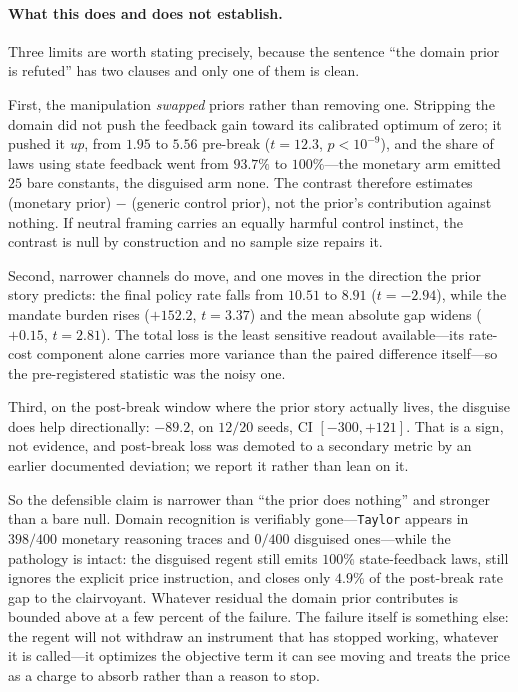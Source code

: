 \documentclass[11pt]{article}
\begin{document}
\paragraph{What this does and does not establish.} Three limits are worth stating precisely, because
the sentence ``the domain prior is refuted'' has two clauses and only one of them is clean.

First, the manipulation \emph{swapped} priors rather than removing one. Stripping the domain did not
push the feedback gain toward its calibrated optimum of zero; it pushed it \emph{up}, from $1.95$ to
$5.56$ pre-break ($t=12.3$, $p<10^{-9}$), and the share of laws using state feedback went from
$93.7\%$ to $100\%$---the monetary arm emitted $25$ bare constants, the disguised arm none. The
contrast therefore estimates (monetary prior) $-$ (generic control prior), not the prior's
contribution against nothing. If neutral framing carries an equally harmful control instinct, the
contrast is null by construction and no sample size repairs it.

Second, narrower channels do move, and one moves in the direction the prior story predicts: the final
policy rate falls from $10.51$ to $8.91$ ($t=-2.94$), while the mandate burden rises ($+152.2$,
$t=3.37$) and the mean absolute gap widens ($+0.15$, $t=2.81$). The total loss is the least sensitive
readout available---its rate-cost component alone carries more variance than the paired difference
itself---so the pre-registered statistic was the noisy one.

Third, on the post-break window where the prior story actually lives, the disguise does help
directionally: $-89.2$, on $12/20$ seeds, CI $[-300, +121]$. That is a sign, not evidence, and
post-break loss was demoted to a secondary metric by an earlier documented deviation; we report it
rather than lean on it.

So the defensible claim is narrower than ``the prior does nothing'' and stronger than a bare null.
Domain recognition is verifiably gone---\texttt{Taylor} appears in $398/400$ monetary reasoning traces
and $0/400$ disguised ones---while the pathology is intact: the disguised regent still emits $100\%$
state-feedback laws, still ignores the explicit price instruction, and closes only $4.9\%$ of the
post-break rate gap to the clairvoyant. Whatever residual the domain prior contributes is bounded
above at a few percent of the failure. The failure itself is something else: the regent will not
withdraw an instrument that has stopped working, whatever it is called---it optimizes the objective
term it can see moving and treats the price as a charge to absorb rather than a reason to stop.
\end{document}
